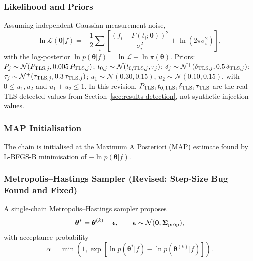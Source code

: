 \documentclass[11pt]{article}
\begin{document}
\subsubsection{Likelihood and Priors}

Assuming independent Gaussian measurement noise,
\begin{equation}
\ln \mathcal L(\boldsymbol\theta|f) = -\frac12 \sum_i \left[ \frac{(f_i - F(t_i;\boldsymbol\theta))^2}{\sigma_i^2} + \ln(2\pi\sigma_i^2) \right],
\label{eq:likelihood}
\end{equation}
with the log-posterior $\ln p(\boldsymbol\theta|f) = \ln\mathcal L + \ln\pi(\boldsymbol\theta)$. Priors: $P_j \sim \mathcal N(P_{{\rm TLS},j}, 0.005\,P_{{\rm TLS},j})$; $t_{0,j}\sim\mathcal N(t_{0,{\rm TLS},j},\tau_j)$; $\delta_j\sim\mathcal N^+(\delta_{{\rm TLS},j},0.5\,\delta_{{\rm TLS},j})$; $\tau_j\sim\mathcal N^+(\tau_{{\rm TLS},j},0.3\,\tau_{{\rm TLS},j})$; $u_1\sim\mathcal N(0.30,0.15)$, $u_2\sim\mathcal N(0.10,0.15)$, with $0\le u_1,u_2$ and $u_1+u_2\le1$. In this revision, $P_{\rm TLS}, t_{0,\rm TLS}, \delta_{\rm TLS}, \tau_{\rm TLS}$ are the real TLS-detected values from Section~\ref{sec:results-detection}, not synthetic injection values.

\subsubsection{MAP Initialisation}

The chain is initialised at the Maximum A Posteriori (MAP) estimate found by L-BFGS-B minimisation \citep{Byrd1995} of $-\ln p(\boldsymbol\theta|f)$.

\subsubsection{Metropolis--Hastings Sampler (Revised: Step-Size Bug Found and Fixed)}

A single-chain Metropolis--Hastings sampler \citep{Metropolis1953,Hastings1970} proposes
\begin{equation}
\boldsymbol\theta^* = \boldsymbol\theta^{(k)} + \boldsymbol\epsilon, \qquad \boldsymbol\epsilon\sim\mathcal N(\mathbf 0,\boldsymbol\Sigma_{\rm prop}),
\label{eq:proposal}
\end{equation}
with acceptance probability
\begin{equation}
\alpha = \min\left(1,\exp\left[\ln p(\boldsymbol\theta^*|f) - \ln p(\boldsymbol\theta^{(k)}|f)\right]\right).
\label{eq:acceptance}
\end{equation}
\end{document}
